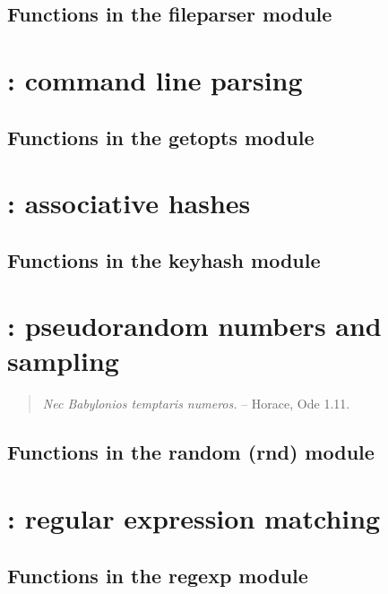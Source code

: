 \documentclass[10pt]{book}
\begin{document}
\subsection{Functions in the fileparser module}


\newpage
\section{: command line parsing}

\subsection{Functions in the getopts module}


\newpage
\section{: associative hashes}

\subsection{Functions in the keyhash module}


\newpage
\section{: pseudorandom numbers and sampling}
\begin{quote}
\emph{Nec Babylonios temptaris numeros.} \hspace{3em} -- Horace, Ode
1.11. \\ 
\end{quote}     

\subsection{Functions in the random (rnd) module}

\vspace*{\fill}

\newpage
\section{: regular expression matching}

\subsection{Functions in the regexp module}

\end{document}
